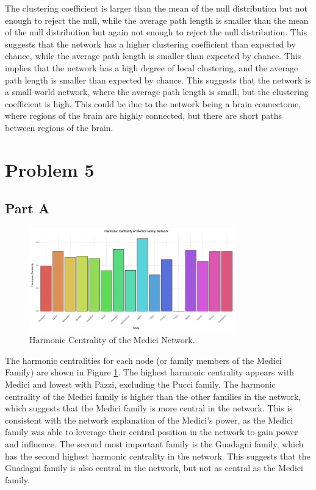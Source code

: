 \documentclass[12pt]{article}
\begin{document}
The clustering coefficient is larger than the mean of the null distribution but not enough to reject the null, while the average path length is smaller than the mean of the null distribution but again not enough to reject the null distribution. This suggests that the network has a higher clustering coefficient than expected by chance, while the average path length is smaller than expected by chance. This implies that the network has a high degree of local clustering, and the average path length is smaller than expected by chance. This suggests that the network is a small-world network, where the average path length is small, but the clustering coefficient is high. This could be due to the network being a brain connectome, where regions of the brain are highly connected, but there are short paths between regions of the brain.

\section*{Problem 5}
\subsection*{Part A}

\begin{figure}[h]
    \centering
    \includegraphics[width=0.8\textwidth]{../figures/harmonic_centrality.png}
    \caption{Harmonic Centrality of the Medici Network.}
    \label{fig:harmonic_centrality}
\end{figure}

The harmonic centralities for each node (or family members of the Medici Family) are shown in Figure \ref{fig:harmonic_centrality}. The highest harmonic centrality appears with Medici and lowest with Pazzi, excluding the Pucci family. The harmonic centrality of the Medici family is higher than the other families in the network, which suggests that the Medici family is more central in the network. This is consistent with the network explanation of the Medici's power, as the Medici family was able to leverage their central position in the network to gain power and influence. The second most important family is the Guadagni family, which has the second highest harmonic centrality in the network. This suggests that the Guadagni family is also central in the network, but not as central as the Medici family.
\end{document}
